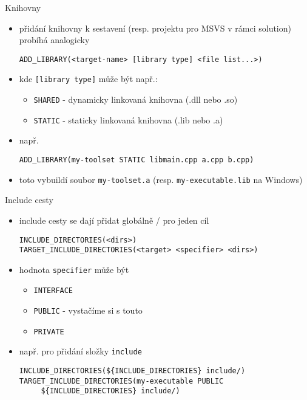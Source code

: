 \documentclass{beamer}
\begin{document}
\begin{xframe}{Knihovny}
	\begin{itemize}
		\item přidání knihovny k sestavení (resp. projektu pro MSVS v rámci solution) probíhá analogicky
\begin{lstlisting}[basicstyle=\fontsize{8}{9}\selectfont\ttfamily]
ADD_LIBRARY(<target-name> [library type] <file list...>)
\end{lstlisting}
		\item kde \texttt{[library type]} může být např.:
			\begin{itemize}
				\item \texttt{SHARED} - dynamicky linkovaná knihovna (.dll nebo .so)
				\item \texttt{STATIC} - staticky linkovaná knihovna (.lib nebo .a)
			\end{itemize}
		\item např.
\begin{lstlisting}[basicstyle=\fontsize{8}{9}\selectfont\ttfamily]
ADD_LIBRARY(my-toolset STATIC libmain.cpp a.cpp b.cpp)
\end{lstlisting}
		\item toto vybuildí soubor \texttt{my-toolset.a} (resp. \texttt{my-executable.lib} na Windows)
	\end{itemize}
\end{xframe}

\begin{xframe}{Include cesty}
	\begin{itemize}
		\item include cesty se dají přidat globálně / pro jeden cíl
\begin{lstlisting}[basicstyle=\fontsize{8}{9}\selectfont\ttfamily]
INCLUDE_DIRECTORIES(<dirs>)
TARGET_INCLUDE_DIRECTORIES(<target> <specifier> <dirs>)
\end{lstlisting}
		\item hodnota \texttt{specifier} může být
			\begin{itemize}
				\item \texttt{INTERFACE}
				\item \texttt{PUBLIC} - vystačíme si s touto
				\item \texttt{PRIVATE}
			\end{itemize}
		\item např. pro přidání složky \texttt{include}
\begin{lstlisting}[basicstyle=\fontsize{8}{9}\selectfont\ttfamily]
INCLUDE_DIRECTORIES(${INCLUDE_DIRECTORIES} include/)
TARGET_INCLUDE_DIRECTORIES(my-executable PUBLIC
     ${INCLUDE_DIRECTORIES} include/)
\end{lstlisting}
	\end{itemize}
\end{xframe}
\end{document}
